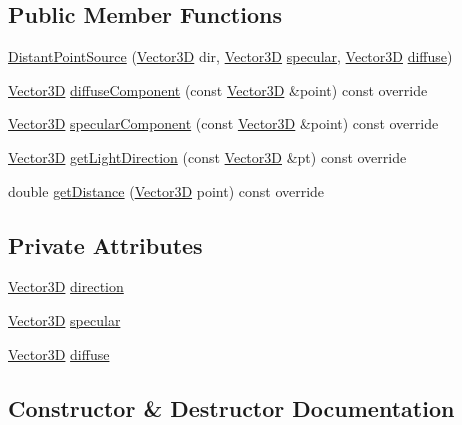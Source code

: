 \subsection*{Public Member Functions}
\begin{DoxyCompactItemize}
\item 
\hyperlink{classDistantPointSource_abb36a1b1376c1d895e11ba5a01466a0b}{Distant\+Point\+Source} (\hyperlink{classVector3D}{Vector3D} dir, \hyperlink{classVector3D}{Vector3D} \hyperlink{classDistantPointSource_af6bebc971d66f68f97045712db771411}{specular}, \hyperlink{classVector3D}{Vector3D} \hyperlink{classDistantPointSource_ab9a77355eb9d8fc8596d75c57de4fb5e}{diffuse})
\item 
\hyperlink{classVector3D}{Vector3D} \hyperlink{classDistantPointSource_ae3682ba2e553f38d6c9e4ee1bed9504f}{diffuse\+Component} (const \hyperlink{classVector3D}{Vector3D} \&point) const override
\item 
\hyperlink{classVector3D}{Vector3D} \hyperlink{classDistantPointSource_a14f9c55d090d7d3f7999db70f5174a8c}{specular\+Component} (const \hyperlink{classVector3D}{Vector3D} \&point) const override
\item 
\hyperlink{classVector3D}{Vector3D} \hyperlink{classDistantPointSource_a740ee32c41e2ef6deec1137c86f5b73a}{get\+Light\+Direction} (const \hyperlink{classVector3D}{Vector3D} \&pt) const override
\item 
double \hyperlink{classDistantPointSource_a5d08b5655fc7fc09e5c0d2a0f3046e16}{get\+Distance} (\hyperlink{classVector3D}{Vector3D} point) const override
\end{DoxyCompactItemize}
\subsection*{Private Attributes}
\begin{DoxyCompactItemize}
\item 
\hyperlink{classVector3D}{Vector3D} \hyperlink{classDistantPointSource_a8ed31d9e26d44381c1bd22b5f1b15c6c}{direction}
\item 
\hyperlink{classVector3D}{Vector3D} \hyperlink{classDistantPointSource_af6bebc971d66f68f97045712db771411}{specular}
\item 
\hyperlink{classVector3D}{Vector3D} \hyperlink{classDistantPointSource_ab9a77355eb9d8fc8596d75c57de4fb5e}{diffuse}
\end{DoxyCompactItemize}


\subsection{Constructor \& Destructor Documentation}
